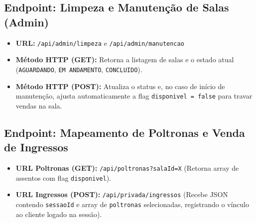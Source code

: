 \subsection{Endpoint: Limpeza e Manutenção de Salas (Admin)}
\begin{itemize}
    \item \textbf{URL:} \texttt{/api/admin/limpeza} e \texttt{/api/admin/manutencao}
    \item \textbf{Método HTTP (GET):} Retorna a listagem de salas e o estado atual (\texttt{AGUARDANDO}, \texttt{EM ANDAMENTO}, \texttt{CONCLUIDO}).
    \item \textbf{Método HTTP (POST):} Atualiza o status e, no caso de início de manutenção, ajusta automaticamente a flag \texttt{disponivel = false} para travar vendas na sala.
\end{itemize}

\subsection{Endpoint: Mapeamento de Poltronas e Venda de Ingressos}
\begin{itemize}
    \item \textbf{URL Poltronas (GET):} \texttt{/api/poltronas?salaId=X} (Retorna array de assentos com flag \texttt{disponivel}).
    \item \textbf{URL Ingressos (POST):} \texttt{/api/privada/ingressos} (Recebe JSON contendo \texttt{sessaoId} e array de \texttt{poltronas} selecionadas, registrando o vínculo ao cliente logado na sessão).
\end{itemize}
